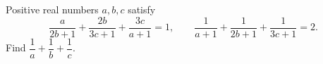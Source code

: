 Positive real numbers $a,b,c$ satisfy
\[\dfrac{a}{2b+1}+\dfrac{2b}{3c+1}+\dfrac{3c}{a+1}=1,\qquad
\dfrac{1}{a+1}+\dfrac{1}{2b+1}+\dfrac{1}{3c+1}=2.\]
Find $\dfrac{1}{a}+\dfrac{1}{b}+\dfrac{1}{c}$.
